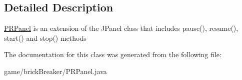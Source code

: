 \subsection{Detailed Description}
\hyperlink{classbrick_breaker_1_1_p_r_panel}{PRPanel} is an extension of the JPanel class that includes pause(), resume(), start() and stop() methods 

The documentation for this class was generated from the following file:\begin{DoxyCompactItemize}
\item 
game/brickBreaker/PRPanel.java\end{DoxyCompactItemize}
